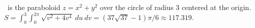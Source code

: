 {\surfaceS\ is the paraboloid $z=x^2+y^2$ over the circle of radius 3 centered at the origin.
}
{$S =\int_0^3\int_0^{2\pi}\sqrt{v^2+4v^4}\ du\ dv= (37\sqrt{37}-1)\pi/6 \approx 117.319$.
}
